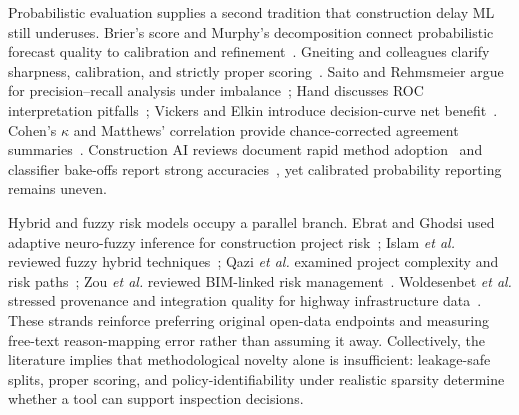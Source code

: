 Probabilistic evaluation supplies a second tradition that construction delay ML still underuses. Brier's score and Murphy's decomposition connect probabilistic forecast quality to calibration and refinement~\cite{Brier1950,Murphy1973}. Gneiting and colleagues clarify sharpness, calibration, and strictly proper scoring~\cite{Gneiting2007,GneitingRaftery2007}. Saito and Rehmsmeier argue for precision--recall analysis under imbalance~\cite{Saito2015}; Hand discusses ROC interpretation pitfalls~\cite{Hand2009}; Vickers and Elkin introduce decision-curve net benefit~\cite{Vickers2006}. Cohen's $\kappa$ and Matthews' correlation provide chance-corrected agreement summaries~\cite{Cohen1960,Matthews1975}. Construction AI reviews document rapid method adoption~\cite{Darko2020,PanYZhang2021,Abioye2021,Regona2024} and classifier bake-offs report strong accuracies~\cite{Egwim2021,Tagharobi2025}, yet calibrated probability reporting remains uneven.

Hybrid and fuzzy risk models occupy a parallel branch. Ebrat and Ghodsi used adaptive neuro-fuzzy inference for construction project risk~\cite{Ebrat2014}; Islam \textit{et al.} reviewed fuzzy hybrid techniques~\cite{Islam2017}; Qazi \textit{et al.} examined project complexity and risk paths~\cite{Qazi2016}; Zou \textit{et al.} reviewed BIM-linked risk management~\cite{Zou2017}. Woldesenbet \textit{et al.} stressed provenance and integration quality for highway infrastructure data~\cite{Woldesenbet2016}. These strands reinforce preferring original open-data endpoints and measuring free-text reason-mapping error rather than assuming it away. Collectively, the literature implies that methodological novelty alone is insufficient: leakage-safe splits, proper scoring, and policy-identifiability under realistic sparsity determine whether a tool can support inspection decisions.
